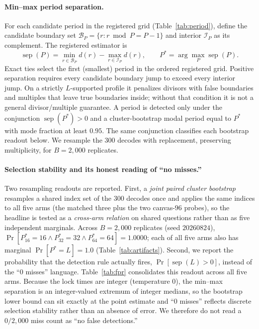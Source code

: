 \documentclass{article}
\begin{document}
\paragraph{Min--max period separation.}
For each candidate period in the registered grid (Table~\ref{tab:period}), define the candidate boundary set
$\mathcal B_P=\{r:r\bmod P=P-1\}$ and interior $\mathcal I_P$ as its complement.
The registered estimator is
\begin{equation}
\operatorname{sep}(P)=\min_{r\in\mathcal B_P}d(r)
-\max_{r\in\mathcal I_P}d(r),\qquad
P^*=\arg\max_P\operatorname{sep}(P).
\label{eq:sep}
\end{equation}
Exact ties select the first (smallest) period in the ordered registered grid.
Positive separation requires every candidate boundary jump to exceed every
interior jump. On a strictly $L$-supported profile it penalizes divisors with
false boundaries and multiples that leave true boundaries inside; without that
condition it is not a general divisor/multiple guarantee. A period is detected
only under the conjunction $\operatorname{sep}(P^*)>0$ and a cluster-bootstrap
modal period equal to $P^*$ with mode fraction at least $0.95$. The same
conjunction classifies each bootstrap readout below. We resample the $300$
decodes with replacement, preserving multiplicity, for $B{=}2{,}000$ replicates.

\paragraph{Selection stability and its honest reading of ``no misses.''}
Two resampling readouts are reported. First, a \emph{joint paired cluster
bootstrap} resamples a shared index set of the $300$ decodes once and applies the
same indices to all five arms (the matched three plus the two canvas-$96$
probes), so the headline is tested as a \emph{cross-arm relation} on shared
questions rather than as five independent marginals. Across $B{=}2{,}000$
replicates (seed $20260824$),
$\Pr[P^*_{16}{=}16\wedge P^*_{32}{=}32\wedge P^*_{64}{=}64]=1.0000$;
each of all five arms also has marginal $\Pr[P^*{=}L]=1.0$
(Table~\ref{tab:artifacts}).
Second, we report the probability that the detection rule actually fires,
$\Pr[\operatorname{sep}(L)>0]$, instead of the ``$0$ misses'' language.
Table~\ref{tab:fpr} consolidates this readout across all five arms. Because the
lock times are integer (temperature $0$), the min--max separation is an
integer-valued extremum of integer medians, so the bootstrap lower bound can sit
exactly at the point estimate and ``$0$ misses'' reflects discrete selection
stability rather than an absence of error. We therefore do not read a
$0/2{,}000$ miss count as ``no false detections.''
\end{document}
